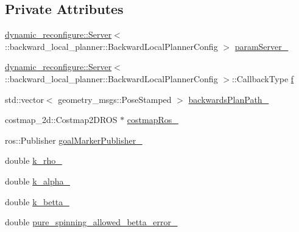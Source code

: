 \subsection*{Private Attributes}
\begin{DoxyCompactItemize}
\item 
\hyperlink{strikes__back_2servers_2led__action__server_2src_2led__action__server__node_8cpp_a2036ae39d23f8e14a2cc8ddcd46dea5a}{dynamic\+\_\+reconfigure\+::\+Server}$<$\+::backward\+\_\+local\+\_\+planner\+::\+Backward\+Local\+Planner\+Config $>$ \hyperlink{classcl__move__base__z_1_1backward__local__planner_1_1BackwardLocalPlanner_afb349461ce9c4edee018dbb822a8cd9a}{param\+Server\+\_\+}
\item 
\hyperlink{strikes__back_2servers_2led__action__server_2src_2led__action__server__node_8cpp_a2036ae39d23f8e14a2cc8ddcd46dea5a}{dynamic\+\_\+reconfigure\+::\+Server}$<$\+::backward\+\_\+local\+\_\+planner\+::\+Backward\+Local\+Planner\+Config $>$\+::Callback\+Type \hyperlink{classcl__move__base__z_1_1backward__local__planner_1_1BackwardLocalPlanner_aebafa83dd5fced64dc2239919a3ab8d8}{f}
\item 
std\+::vector$<$ geometry\+\_\+msgs\+::\+Pose\+Stamped $>$ \hyperlink{classcl__move__base__z_1_1backward__local__planner_1_1BackwardLocalPlanner_ad9cde5c85f782cab2ddb4030e3c3f2cf}{backwards\+Plan\+Path\+\_\+}
\item 
costmap\+\_\+2d\+::\+Costmap2\+D\+R\+OS $\ast$ \hyperlink{classcl__move__base__z_1_1backward__local__planner_1_1BackwardLocalPlanner_a4136268882a105d9e06e173d85d5c0dc}{costmap\+Ros\+\_\+}
\item 
ros\+::\+Publisher \hyperlink{classcl__move__base__z_1_1backward__local__planner_1_1BackwardLocalPlanner_a79f0ddfa686e2cd47bbc2f0bac9f3d4c}{goal\+Marker\+Publisher\+\_\+}
\item 
double \hyperlink{classcl__move__base__z_1_1backward__local__planner_1_1BackwardLocalPlanner_ad8a36184bfb011545c751109e23d3b98}{k\+\_\+rho\+\_\+}
\item 
double \hyperlink{classcl__move__base__z_1_1backward__local__planner_1_1BackwardLocalPlanner_abf7a5a56de2ee41afba7e63c0628ec35}{k\+\_\+alpha\+\_\+}
\item 
double \hyperlink{classcl__move__base__z_1_1backward__local__planner_1_1BackwardLocalPlanner_a9f257183d87f1d732cb7e404f09905ad}{k\+\_\+betta\+\_\+}
\item 
double \hyperlink{classcl__move__base__z_1_1backward__local__planner_1_1BackwardLocalPlanner_a957d163366cfeaf20d5534a7208fc326}{pure\+\_\+spinning\+\_\+allowed\+\_\+betta\+\_\+error\+\_\+}

\end{DoxyCompactItemize}
